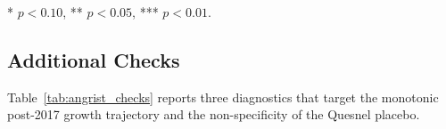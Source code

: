 \documentclass[12pt]{article}
\begin{document}
\begin{table}[t]
{\begin{threeparttable}
\begin{tablenotes}[flushleft]
      * $p < 0.10$, ** $p < 0.05$, *** $p < 0.01$.
   \end{tablenotes}
   \end{threeparttable}}
\end{table}

\subsection{Additional Checks}
\label{sec:angrist_checks}

Table~\ref{tab:angrist_checks} reports three diagnostics that target the monotonic
post-2017 growth trajectory and the non-specificity of the Quesnel placebo.
\end{document}
